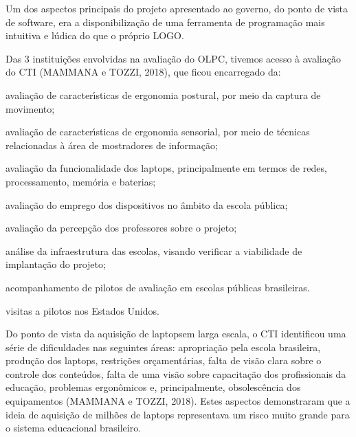 \documentclass[
12pt,		%
openright,	%
twoside,  %
a4paper,			%
chapter=TITLE,		%
english,			%
french,				%
spanish,			%
brazil				%
]{USPSC-classe/USPSC}
\begin{document}
Um dos aspectos principais do projeto apresentado ao governo, do ponto de vista de software, era a disponibiliza\c{c}\~ao de uma ferramenta de programa\c{c}\~ao mais intuitiva e l\'udica do que o pr\'oprio LOGO.









Das 3 institui\c{c}\~oes envolvidas na avalia\c{c}\~ao do OLPC, tivemos acesso \`a avalia\c{c}\~ao do CTI  (MAMMANA e TOZZI, 2018), que ficou encarregado da:










\begin{alineas}
\item avalia\c{c}\~ao de caracter\'{\i}sticas de ergonomia postural, por meio da captura de movimento;
\item avalia\c{c}\~ao de caracter\'{\i}sticas de ergonomia sensorial, por meio de t\'ecnicas relacionadas \`a \'area de mostradores de informa\c{c}\~ao;
\item avalia\c{c}\~ao da funcionalidade dos \textquotedbl laptops, principalmente em termos de redes, processamento, mem\'oria e baterias;
\item avalia\c{c}\~ao do emprego dos dispositivos no \^ambito da escola p\'ublica;
\item avalia\c{c}\~ao da percep\c{c}\~ao dos professores sobre o projeto;
\item an\'alise da infraestrutura das escolas, visando verificar a viabilidade de implanta\c{c}\~ao do projeto;
\item acompanhamento de pilotos de avalia\c{c}\~ao em escolas p\'ublicas brasileiras.
\item visitas a pilotos nos Estados Unidos.
\end{alineas}

Do ponto de vista da aquisi\c{c}\~ao de \textquotedbl laptops\textquotedbl  em larga escala, o CTI identificou uma s\'erie de dificuldades nas seguintes \'areas: apropria\c{c}\~ao pela escola brasileira, produ\c{c}\~ao dos laptops, restri\c{c}\~oes or\c{c}ament\'arias, falta de vis\~ao clara sobre o controle dos conte\'udos, falta de uma vis\~ao sobre capacita\c{c}\~ao dos profissionais da educa\c{c}\~ao, problemas ergon\^omicos e, principalmente, obsolesc\^encia dos equipamentos  (MAMMANA e TOZZI, 2018). Estes aspectos demonstraram que a ideia de aquisi\c{c}\~ao de milh\~oes de laptops representava um risco muito grande para o sistema educacional brasileiro.
\end{document}
